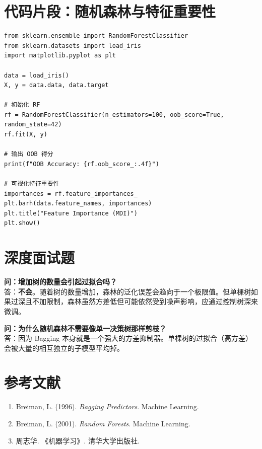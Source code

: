 \documentclass[12pt, a4paper]{article}
\begin{document}
\section{代码片段：随机森林与特征重要性}
\begin{lstlisting}
from sklearn.ensemble import RandomForestClassifier
from sklearn.datasets import load_iris
import matplotlib.pyplot as plt

data = load_iris()
X, y = data.data, data.target

# 初始化 RF
rf = RandomForestClassifier(n_estimators=100, oob_score=True, random_state=42)
rf.fit(X, y)

# 输出 OOB 得分
print(f"OOB Accuracy: {rf.oob_score_:.4f}")

# 可视化特征重要性
importances = rf.feature_importances_
plt.barh(data.feature_names, importances)
plt.title("Feature Importance (MDI)")
plt.show()
\end{lstlisting}

\section{深度面试题}
\textbf{问：增加树的数量会引起过拟合吗？}\\
答：\textbf{不会}。随着树的数量增加，森林的泛化误差会趋向于一个极限值。但单棵树如果过深且不加限制，森林虽然方差低但可能依然受到噪声影响，应通过控制树深来微调。

\textbf{问：为什么随机森林不需要像单一决策树那样剪枝？}\\
答：因为 Bagging 本身就是一个强大的方差抑制器。单棵树的过拟合（高方差）会被大量的相互独立的子模型平均掉。

\section{参考文献}
\begin{enumerate}
    \item Breiman, L. (1996). \textit{Bagging Predictors}. Machine Learning.
    \item Breiman, L. (2001). \textit{Random Forests}. Machine Learning.
    \item 周志华. 《机器学习》. 清华大学出版社.
\end{enumerate}
\end{document}
